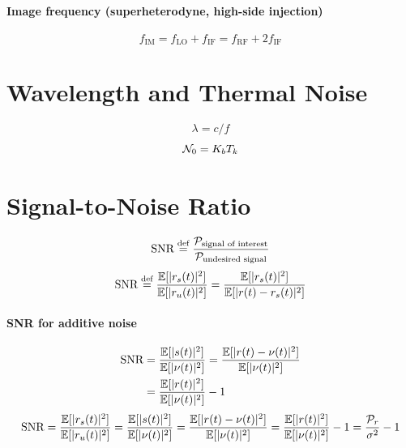 \paragraph{Image frequency (superheterodyne, high-side injection)}
\begin{equation}
f_{\textrm{IM}} = f_{\textrm{LO}}+f_{\textrm{IF}} = f_{\textrm{RF}} + 2 f_{\textrm{IF}}
\end{equation}

\section*{Wavelength and Thermal Noise}

\begin{equation}
\lambda = c / f
\label{eq:antenna}
\end{equation}
\begin{equation}
{\cal N}_0 = K_b T_k
\label{eq:psdThermal}
\end{equation}

\section*{Signal-to-Noise Ratio}

\begin{equation}
{\textrm{SNR}} \stackrel{\text{def}}{=} \frac{{\cal P}_{\textrm{signal of interest}}}{{\cal P}_{\textrm{undesired signal}}}
\label{eq:snr_simple}
\end{equation}
\begin{equation}
{\textrm{SNR}} \stackrel{\text{def}}{=} \frac{\mathbb{E}[|r_s(t)|^2]}{\mathbb{E}[|r_u(t)|^2]} = \frac{\mathbb{E}[|r_s(t)|^2]}{\mathbb{E}[|r(t)-r_s(t)|^2]}
\label{eq:snr_simple2}
\end{equation}

\paragraph{SNR for additive noise}
\begin{align}
{\textrm{SNR}} & = \frac{\mathbb{E}[|s(t)|^2]}{\mathbb{E}[|\nu(t)|^2]} = \frac{\mathbb{E}[|r(t)-\nu(t)|^2]}{\mathbb{E}[|\nu(t)|^2]} \nonumber \\
     & = \frac{\mathbb{E}[|r(t)|^2]}{\mathbb{E}[|\nu(t)|^2]} - 1
\end{align}
\begin{equation}
{\textrm{SNR}} = \frac{\mathbb{E}[|r_s(t)|^2]}{\mathbb{E}[|r_u(t)|^2]}  = \frac{\mathbb{E}[|s(t)|^2]}{\mathbb{E}[|\nu(t)|^2]} = \frac{\mathbb{E}[|r(t)-\nu(t)|^2]}{\mathbb{E}[|\nu(t)|^2]}  = \frac{\mathbb{E}[|r(t)|^2]}{\mathbb{E}[|\nu(t)|^2]} - 1 = \frac{{\cal P}_r}{\sigma^2} - 1
\label{eq:snr_awgn}
\end{equation}

